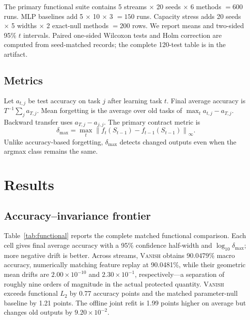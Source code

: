 \documentclass{vanish_ieee}
\theoremstyle{definition}
\newcommand{\norm}[1]{\left\lVert#1\right\rVert}
\newcommand{\VANISH}{\textsc{Vanish}}
\begin{document}
The primary functional suite contains 5 streams $\times$ 20 seeds $\times$ 6 methods $=600$ runs.  MLP baselines add 5 $\times$ 10 $\times$ 3 $=150$ runs.  Capacity stress adds 20 seeds $\times$ 5 widths $\times$ 2 exact-null methods $=200$ rows.  We report means and two-sided 95\% $t$ intervals.  Paired one-sided Wilcoxon tests \cite{wilcoxon1945} and Holm correction \cite{holm1979} are computed from seed-matched records; the complete 120-test table is in the artifact.

\subsection{Metrics}

Let $a_{t,j}$ be test accuracy on task $j$ after learning task $t$.  Final average accuracy is $T^{-1}\sum_j a_{T,j}$.  Mean forgetting is the average over old tasks of $\max_t a_{t,j}-a_{T,j}$.  Backward transfer uses $a_{T,j}-a_{j,j}$.  The primary contract metric is
\begin{equation}
\delta_{\max}=\max_t\norm{f_t(S_{t-1})-f_{t-1}(S_{t-1})}_\infty.
\end{equation}
Unlike accuracy-based forgetting, $\delta_{\max}$ detects changed outputs even when the argmax class remains the same.

\section{Results}

\subsection{Accuracy--invariance frontier}

Table~\ref{tab:functional} reports the complete matched functional comparison.  Each cell gives final average accuracy with a 95\% confidence half-width and $\log_{10}\delta_{\max}$; more negative drift is better.  Across streams, \VANISH{} obtains 90.0479\% macro accuracy, numerically matching feature replay at 90.0481\%, while their geometric mean drifts are $2.00\times10^{-10}$ and $2.30\times10^{-1}$, respectively---a separation of roughly nine orders of magnitude in the actual protected quantity.  \VANISH{} exceeds functional $L_2$ by 0.77 accuracy points and the matched parameter-null baseline by 1.21 points.  The offline joint refit is 1.99 points higher on average but changes old outputs by $9.20\times10^{-2}$.
\end{document}
